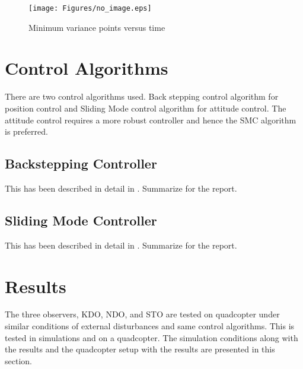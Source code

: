 \documentclass{article}
\begin{document}
\begin{figure}[H]
\centering
\texttt{[image: Figures/no\_image.eps]}
\caption{Minimum variance points versus time}
\label{quad_red_balls}
\end{figure}

\section{Control Algorithms}
There are two control algorithms used. Back stepping control algorithm for position control and Sliding Mode control algorithm for attitude control. The attitude control requires a more robust controller and hence the SMC algorithm is preferred. 






\subsection{Backstepping Controller}
This has been described in detail in \cite{fethalla2017backstepping}. Summarize for the report.


\subsection{Sliding Mode Controller}
This has been described in detail in \cite{fethalla2018sliding}. Summarize for the report.





\section{Results}
The three observers, KDO, NDO, and STO are tested on quadcopter under similar conditions of external disturbances and same control algorithms. This is tested in simulations and on a quadcopter. The simulation conditions along with the results and the quadcopter setup with the results are presented in this section. 
\end{document}
